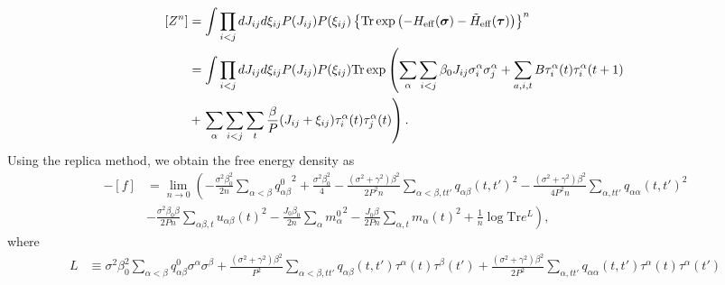 \documentclass[aps,pra,twocolumn,groupedaddress,longbibliography]{revtex4}
\def\v#1{\mbox{\boldmath $#1$}}
\newcommand{\Sig}{\sigma}
\begin{document}
\begin{widetext}
\begin{align}
	[Z^n] &= \int \prod_{i<j}dJ_{ij}d{\xi_{ij}}P(J_{ij})P(\xi_{ij}) \left\{\mathrm{Tr}\exp{\left(-H_{\mathrm{eff}}(\v{\Sig})-\tilde{H}_{\mathrm{eff}}(\v{\tau})\right)}\right\}^{n} \nonumber \\
	&= \int \prod_{i<j}dJ_{ij}d{\xi_{ij}}P(J_{ij})P(\xi_{ij}) \mathrm{Tr}\exp\left(\sum_{\alpha}\sum_{i<j}\beta_0 J_{ij}\Sig_i^{\alpha}\Sig_j^{\alpha}+\sum_{a,i,t}B\tau_i^{\alpha}(t)\tau_i^{\alpha}(t+1)\right. \nonumber \\
	&+\left.\sum_{\alpha}\sum_{i<j}\sum_{t}\frac{\beta}{P}(J_{ij}+\xi_{ij})\tau_i^{\alpha}(t)\tau_j^{\alpha}(t)\right).
\end{align}
Using the replica method, we obtain the free energy density as
\begin{align}
	-[f] &= \lim_{n \to 0} \left(-\frac{\sigma^2 \beta_0^2}{2n}\sum_{\alpha < \beta}{q_{\alpha \beta}^{0}}^2+\frac{\sigma^2 \beta_0^2}{4}-\frac{(\sigma^2+\gamma^2)\beta^2}{2P^2n}\sum_{\alpha<\beta,tt'}q_{\alpha \beta}(t,t')^2-\frac{(\sigma^2+\gamma^2)\beta^2}{4P^2n}\sum_{\alpha,tt'}q_{\alpha \alpha}(t,t')^2\right. \nonumber \\
	&-\left.\frac{\sigma^2 \beta_0 \beta}{2Pn}\sum_{\alpha\beta,t}u_{\alpha \beta}(t)^2-\frac{J_0 \beta_0}{2n}\sum_{\alpha}{m_{\alpha}^{0}}^2-\frac{J_0 \beta}{2Pn}\sum_{\alpha,t}m_{\alpha}(t)^2+\frac{1}{n}\log{\mathrm{Tr}e^{L}}\right),
\end{align}
where
\begin{align}
	L &\equiv \sigma^2 \beta_0^2 \sum_{\alpha<\beta}q_{\alpha \beta}^{0}\Sig^{\alpha}\Sig^{\beta}+\frac{(\sigma^2+\gamma^2)\beta^2}{P^2}\sum_{\alpha<\beta,tt'}q_{\alpha \beta}(t,t')\tau^{\alpha}(t)\tau^{\beta}(t')+\frac{(\sigma^2+\gamma^2)\beta^2}{2P^2}\sum_{\alpha,tt'}q_{\alpha \alpha}(t,t')\tau^{\alpha}(t)\tau^{\alpha}(t') \nonumber \\

\end{align}
\end{widetext}
\end{document}
